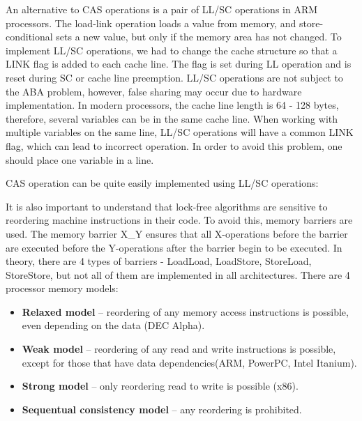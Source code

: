 {\begin{figure}[H]
	\end{figure}
	\par An alternative to CAS operations is a pair of LL/SC operations in ARM processors. The load-link operation loads a value from memory, and store-conditional sets a new value, but only if the memory area has not changed. To implement LL/SC operations, we had to change the cache structure so that a LINK flag is added to each cache line. The flag is set during LL operation and is reset during SC or cache line preemption. LL/SC operations are not subject to the ABA problem, however, false sharing may occur due to hardware implementation. In modern processors, the cache line length is 64 - 128 bytes, therefore, several variables can be in the same cache line. When working with multiple variables on the same line, LL/SC operations will have a common LINK flag, which can lead to incorrect operation. In order to avoid this problem, one should place one variable in a line.
	\begin{figure}[H]
		
	\end{figure}
	\par CAS operation can be quite easily implemented using LL/SC operations:
	\begin{figure}[H]
		
	\end{figure}
	\par It is also important to understand that lock-free algorithms are sensitive to reordering machine instructions in their code. To avoid this, memory barriers are used. The memory barrier X\_Y ensures that all X-operations before the barrier are executed before the Y-operations after the barrier begin to be executed. In theory, there are 4 types of barriers - LoadLoad, LoadStore, StoreLoad, StoreStore, but not all of them are implemented in all architectures. There are 4 processor memory models:
	\begin{itemize}  
		\item\textbf{Relaxed model} -- reordering of any memory access instructions is possible, even depending on the data (DEC Alpha).
		\item\textbf{Weak model} -- reordering of any read and write instructions is possible, except for those that have data dependencies(ARM, PowerPC, Intel Itanium).
		\item\textbf{Strong model } -- only reordering read to write is possible (x86).
		\item\textbf{Sequentual consistency model} -- any reordering is prohibited.

\end{itemize}}
